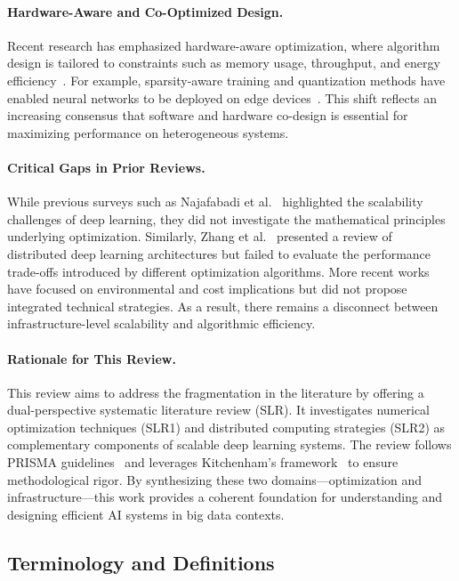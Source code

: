 \documentclass[acmsmall]{acmart}
\begin{document}
\paragraph{Hardware-Aware and Co-Optimized Design.}
Recent research has emphasized hardware-aware optimization, where algorithm design is tailored to constraints such as memory usage, throughput, and energy efficiency~\citet{capra2020hardware}. 
For example, sparsity-aware training and quantization methods have enabled neural networks to be deployed on edge devices~\citet{han2015deep}. 
This shift reflects an increasing consensus that software and hardware co-design is essential for maximizing performance on heterogeneous systems.

\paragraph{Critical Gaps in Prior Reviews.}
While previous surveys such as Najafabadi et al.~\citet{najafabadi2015deep} highlighted the scalability challenges of deep learning, they did not investigate the mathematical principles underlying optimization. 
Similarly, Zhang et al.~\citet{zhang2019deep} presented a review of distributed deep learning architectures but failed to evaluate the performance trade-offs introduced by different optimization algorithms. 
More recent works~\citet{Thompson2020} have focused on environmental and cost implications but did not propose integrated technical strategies. As a result, there remains a disconnect 
between infrastructure-level scalability and algorithmic efficiency.

\paragraph{Rationale for This Review.}
This review aims to address the fragmentation in the literature by offering a dual-perspective systematic literature review (SLR). 
It investigates numerical optimization techniques (SLR1) and distributed computing strategies (SLR2) as complementary components of scalable deep learning systems. 
The review follows PRISMA guidelines~\citet{moher2009preferred} and leverages Kitchenham's framework~\citet{kitchenham2007guidelines} to ensure methodological rigor. 
By synthesizing these two domains—optimization and infrastructure—this work provides a coherent foundation for understanding and designing efficient AI systems in big data contexts.

\subsection{Terminology and Definitions}
\label{subsec:terminology-and-definitions}
\end{document}
